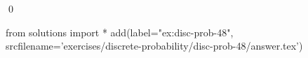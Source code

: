 
\begin{ex} 
  \label{ex:disc-prob-48}
  
  \qed
\end{ex} 
\begin{python0}
from solutions import *
add(label="ex:disc-prob-48",
    srcfilename='exercises/discrete-probability/disc-prob-48/answer.tex') 
\end{python0}
